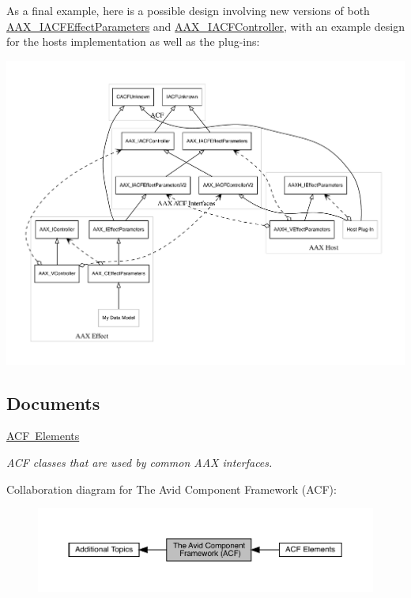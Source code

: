 As a final example, here is a possible design involving new versions of both \mbox{\hyperlink{a01669}{A\+A\+X\+\_\+\+I\+A\+C\+F\+Effect\+Parameters}} and \mbox{\hyperlink{a01637}{A\+A\+X\+\_\+\+I\+A\+C\+F\+Controller}}, with an example design for the host\textquotesingle{}s implementation as well as the plug-\/in\textquotesingle{}s\+:


\begin{DoxyImage}
\includegraphics[width=\textwidth,height=\textheight/2,keepaspectratio=true]{dot_aax_acf_versioning_full_v2}
\end{DoxyImage}
\subsection*{Documents}
\begin{DoxyCompactItemize}
\item 
\mbox{\hyperlink{a00828}{A\+C\+F Elements}}
\begin{DoxyCompactList}\small\item\em A\+CF classes that are used by common A\+AX interfaces. \end{DoxyCompactList}\end{DoxyCompactItemize}
Collaboration diagram for The Avid Component Framework (A\+CF)\+:
\nopagebreak
\begin{figure}[H]
\begin{center}
\leavevmode
\includegraphics[width=350pt]{a00827}
\end{center}
\end{figure}
